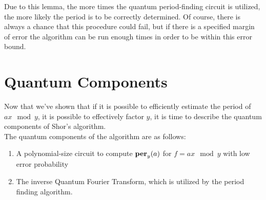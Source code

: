 \documentclass{exam} %
\theoremstyle{plain}
\theoremstyle{definition}
\theoremstyle{remark}
\numberwithin{equation}{section}  %
\newcommand{\per}{\text{\textbf{per}}}
\begin{document}
Due to this lemma, the more times the quantum period-finding circuit is 
utilized, the more likely the period is to be correctly determined. Of course,
there is always a chance that this procedure could fail, but if there is a 
specified margin of error the algorithm can be run enough times in order to 
be within this error bound. 
\section{Quantum Components}

Now that we've shown that if it is possible to efficiently estimate the
period of $ax\mod y$, it is possible to effectively factor $y$, it is
time to describe the quantum components of Shor's algorithm.\\

The quantum components of the algorithm are as follows:
\begin{enumerate}
  \item A polynomial-size circuit to compute $\per_y(a)$ for $f = ax \mod y$ 
    with low error probability
  \item The inverse Quantum Fourier Transform, which is utilized by the 
    period finding algorithm.
\end{enumerate}
\end{document}
